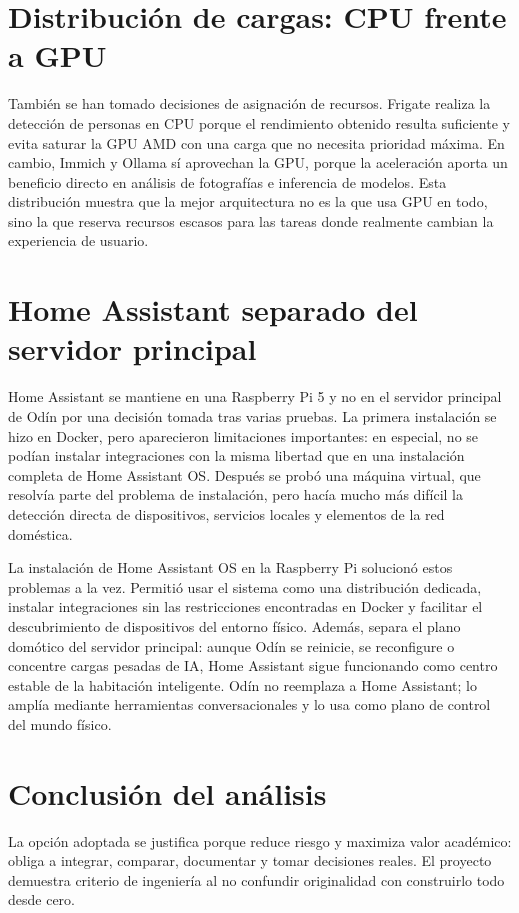 \section{Distribución de cargas: CPU frente a GPU}
También se han tomado decisiones de asignación de recursos. Frigate realiza la detección de personas en CPU porque el rendimiento obtenido resulta suficiente y evita saturar la GPU AMD con una carga que no necesita prioridad máxima. En cambio, Immich y Ollama sí aprovechan la GPU, porque la aceleración aporta un beneficio directo en análisis de fotografías e inferencia de modelos. Esta distribución muestra que la mejor arquitectura no es la que usa GPU en todo, sino la que reserva recursos escasos para las tareas donde realmente cambian la experiencia de usuario.

\section{Home Assistant separado del servidor principal}
Home Assistant se mantiene en una Raspberry Pi 5 y no en el servidor principal de Odín por una decisión tomada tras varias pruebas. La primera instalación se hizo en Docker, pero aparecieron limitaciones importantes: en especial, no se podían instalar integraciones con la misma libertad que en una instalación completa de Home Assistant OS. Después se probó una máquina virtual, que resolvía parte del problema de instalación, pero hacía mucho más difícil la detección directa de dispositivos, servicios locales y elementos de la red doméstica.

La instalación de Home Assistant OS en la Raspberry Pi solucionó estos problemas a la vez. Permitió usar el sistema como una distribución dedicada, instalar integraciones sin las restricciones encontradas en Docker y facilitar el descubrimiento de dispositivos del entorno físico. Además, separa el plano domótico del servidor principal: aunque Odín se reinicie, se reconfigure o concentre cargas pesadas de IA, Home Assistant sigue funcionando como centro estable de la habitación inteligente. Odín no reemplaza a Home Assistant; lo amplía mediante herramientas conversacionales y lo usa como plano de control del mundo físico.

\section{Conclusión del análisis}
La opción adoptada se justifica porque reduce riesgo y maximiza valor académico: obliga a integrar, comparar, documentar y tomar decisiones reales. El proyecto demuestra criterio de ingeniería al no confundir originalidad con construirlo todo desde cero.
